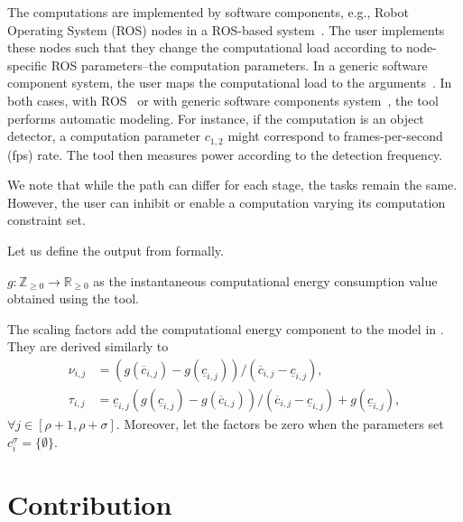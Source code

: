 The computations are implemented by software components, e.g., Robot Operating System (ROS) nodes in a ROS-based system~\citep{quigley2009ros}. The user implements these nodes such that they change the computational load according to node-specific ROS parameters--the computation parameters. In a generic software component system, the user maps the computational load to the arguments~\citep{seewald2019component}. In both cases, with ROS~\citep{zamanakos2020energy} or with generic software components system~\citep{seewald2019component}, the tool performs automatic modeling. For instance, if the computation is an object detector, a computation parameter $c_{1,2}$ might correspond to frames-per-second (fps) rate. The tool then measures power according to the detection frequency.

We note that while the path can differ for each stage, the tasks remain the same. However, the user can inhibit or enable a computation varying its computation constraint set.

Let us define the output from \powprof{} formally.

\begin{highlight}
\begin{defn}\label{def:comp-ener}
  $g:\mathbb{Z}_{\geq 0}\rightarrow\mathbb{R}_{\geq 0}$ as the instantaneous computational energy consumption value obtained using the \powprof{} tool.  
\end{defn}
\end{highlight}

The scaling factors add the computational energy component to the model in . They are derived similarly to 
\begin{subequations}\label{eq:scale-comp}\begin{align}
  \nu_{i,j}&=(g(\overline{c}_{i,j})-g(\underline{c}_{i,j}))/(\overline{c}_{i,j}-\underline{c}_{i,j}),\\
  \tau_{i,j}&=\underline{c}_{i,j}(g(\underline{c}_{i,j})-g(\overline{c}_{i,j}))/(\overline{c}_{i,j}-\underline{c}_{i,j})+g(\underline{c}_{i,j}),
\end{align}\end{subequations}
$\forall j\in[\rho+1,\rho+\sigma]$. Moreover, let the factors be zero when the parameters set $c_i^\sigma=\{\emptyset\}$.


\section{\color{red}Contribution}


